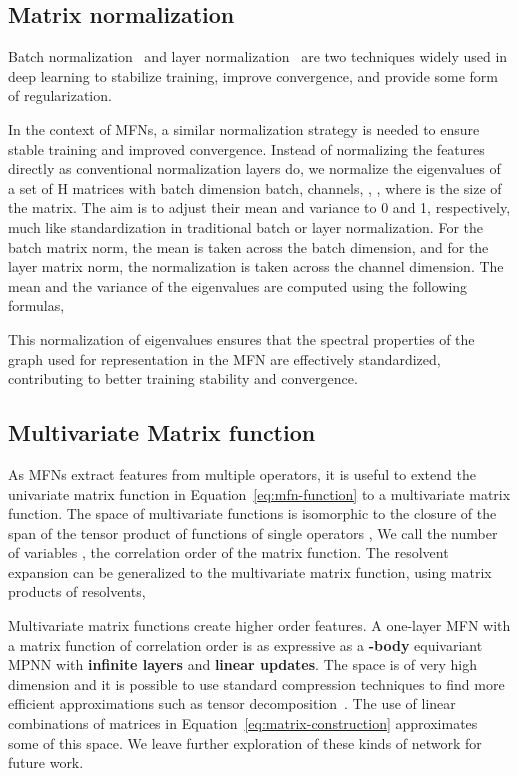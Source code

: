 \documentclass{article} \usepackage{iclr2024_conference,times}
\begin{document}
\vspace{-10pt}
\subsection{Matrix normalization}
\vspace{-5pt}
Batch normalization~\citep{ioffe2015batch} and layer normalization~\citep{ba2016layer} are two techniques widely used in deep learning to stabilize training, improve convergence, and provide some form of regularization.

In the context of MFNs, a similar normalization strategy is needed to ensure stable training and improved convergence. Instead of normalizing the features directly as conventional normalization layers do, we normalize the eigenvalues of a set of H matrices with batch dimension  batch, channels, , , where  is the size of the matrix. The aim is to adjust their mean and variance to 0 and 1, respectively, much like standardization in traditional batch or layer normalization. For the batch matrix norm, the mean is taken across the batch dimension, and for the layer matrix norm, the normalization is taken across the channel dimension.
The mean and the variance of the eigenvalues are computed using the following formulas,

This normalization of eigenvalues ensures that the spectral properties of the graph used for representation in the MFN are effectively standardized, contributing to better training stability and convergence.

\subsection{Multivariate Matrix function}
\label{sec:multivariate}
As MFNs extract features from multiple operators, it is useful to extend the univariate matrix function in Equation~\ref{eq:mfn-function} to a multivariate matrix function. The space of multivariate functions  is isomorphic to the closure of the span of the tensor product of functions of single operators ,
We call the number of variables , the correlation order of the matrix function. The resolvent expansion can be generalized to the multivariate matrix function, using matrix products of resolvents,

Multivariate matrix functions create higher order features. A one-layer MFN with a matrix function of correlation order  is as expressive as a \textbf{-body} equivariant MPNN with \textbf{infinite layers} and \textbf{linear updates}.
The space  is of very high dimension and it is possible to use standard compression techniques to find more efficient approximations such as tensor decomposition~\citep{TraceDarby2023}.
The use of linear combinations of matrices in Equation~\ref{eq:matrix-construction} approximates some of this space.
We leave further exploration of these kinds of network for future work.
\end{document}
